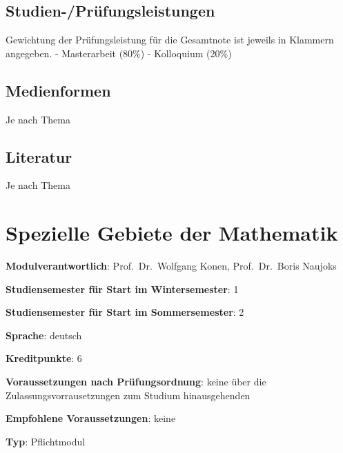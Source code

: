 \section*{Studien-/Prüfungsleistungen\label{/mi-2017/modulbeschreibungen-master/MA_All_Modul_Masterarbeit}}\label{studien-pruxfcfungsleistungenpathlabelmi-2017modulbeschreibungen-mastermaux5fallux5fmodulux5fmasterarbeit}

Gewichtung der Prüfungsleistung für die Gesamtnote ist jeweils in
Klammern angegeben. - Masterarbeit (80\%) - Kolloquium (20\%)

\section*{Medienformen\label{/mi-2017/modulbeschreibungen-master/MA_All_Modul_Masterarbeit}}\label{medienformenpathlabelmi-2017modulbeschreibungen-mastermaux5fallux5fmodulux5fmasterarbeit}

Je nach Thema

\section*{Literatur\label{/mi-2017/modulbeschreibungen-master/MA_All_Modul_Masterarbeit}}\label{literaturpathlabelmi-2017modulbeschreibungen-mastermaux5fallux5fmodulux5fmasterarbeit}

Je nach Thema

\chapter{Spezielle Gebiete der
Mathematik\label{/mi-2017/modulbeschreibungen-master/MA_All_Modul_Mathematik}}\label{spezielle-gebiete-der-mathematikpathlabelmi-2017modulbeschreibungen-mastermaux5fallux5fmodulux5fmathematik}

\begin{modulHead}
\textbf{Modulverantwortlich}: Prof.~Dr.~Wolfgang
Konen, Prof.~Dr.~Boris
Naujoks
\end{modulHead}
\begin{modulHead}
\textbf{Studiensemester für
Start im Wintersemester}:
1
\end{modulHead}
\begin{modulHead}
\textbf{Studiensemester für Start
im Sommersemester}:
2
\end{modulHead}
\begin{modulHead}
\textbf{Sprache}:
deutsch
\end{modulHead}
\begin{modulHead}
\textbf{Kreditpunkte}:
6
\end{modulHead}
\begin{modulHead}
\textbf{Voraussetzungen nach
Prüfungsordnung}: keine über die Zulassungsvorrausetzungen zum Studium
hinausgehenden
\end{modulHead}
\begin{modulHead}
\textbf{Empfohlene
Voraussetzungen}: keine
\end{modulHead}
\begin{modulHead}
\textbf{Typ}:
Pflichtmodul
\end{modulHead}


